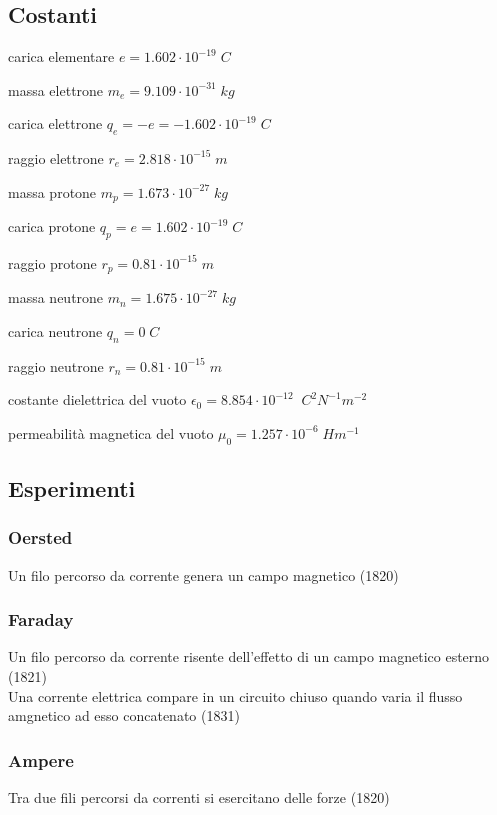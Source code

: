 \documentclass[11pt,a4paper]{article}
\newcommand{\E}[1]{\cdot 10^{#1}}
\begin{document}
	
\tableofcontents
\newpage
	
	\section*{}
\subsection{Costanti}
\begin{list}{}
	\item carica elementare $e = 1.602 \E{-19} \; C$
	\item massa elettrone $m_e = 9.109 \E{-31} \; kg$
	\item carica elettrone $q_e = -e = -1.602 \E{-19} \; C$
	\item raggio elettrone $r_e = 2.818 \E{-15} \; m $
	\item massa protone $m_p = 1.673 \E{-27} \; kg$
	\item carica protone $q_p = e = 1.602 \E{-19} \; C$
	\item raggio protone $r_p = 0.81 \E{-15} \; m$
	\item massa neutrone $m_n = 1.675 \E{-27} \; kg$
	\item carica neutrone $q_n = 0 \; C$
	\item raggio neutrone $r_n = 0.81 \E{-15} \; m$
	\item costante dielettrica del vuoto $\epsilon_0 = 8.854 \E{-12} \;\; C^2 N^{-1} m^{-2}$
	\item permeabilità magnetica del vuoto $\mu_0 = 1.257 \E{-6} \; Hm^{-1}$
\end{list}
\subsection{Esperimenti}
\subsubsection{Oersted}
Un filo percorso da corrente genera un campo magnetico (1820)
\subsubsection{Faraday}
Un filo percorso da corrente risente dell'effetto di un campo magnetico esterno (1821)\\
Una corrente elettrica compare in un circuito chiuso quando varia il flusso amgnetico ad esso concatenato (1831)
\subsubsection{Ampere}
Tra due fili percorsi da correnti si esercitano delle forze (1820)
\end{document}
